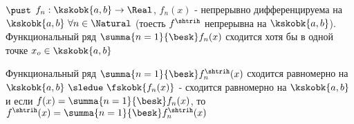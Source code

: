 \begin{proofs}
		$\pust$ $f_n: \kskobk{a,b} \to \Real$, $f_n(x)$ - непрерывно дифференцируема на $\kskobk{a,b} \ \forall n \in \Natural$ (тоесть $f^{\shtrih}$ непрерывна на $\kskobk{a,b}$). Функциональный ряд $\summa{n=1}{\besk}f_n(x)$ сходится хотя бы в одной точке $x_o \in \kskobk{a,b}$

		Функциональный ряд $\summa{n=1}{\besk}f^{\shtrih}_{n}(x)$ сходится равномерно на $\kskobk{a,b} \ \sledue \ \fskobk{f_n(x)}$ - сходится равномерно на $\kskobk{a,b}$ и если $f(x) = \summa{n=1}{\besk}f_n(x)$, то $f^{\shtrih}(x)= \summa{n=1}{\besk}f_{n}^{\shtrih}(x)$
\end{proofs}
